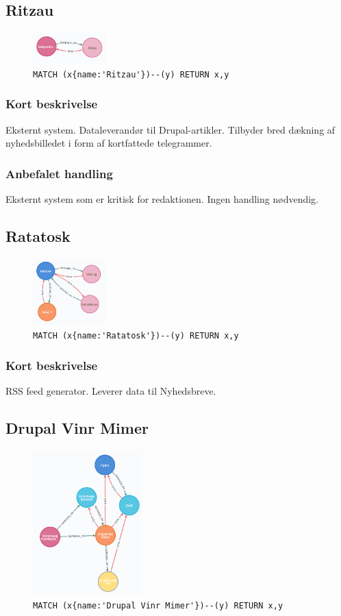 \documentclass{article}
\begin{document}
\subsection{Ritzau}
\begin{figure}[H]
\includegraphics[width=80pt]{Ritzau.PNG}
\cprotect\caption{\verb|MATCH (x{name:'Ritzau'})--(y) RETURN x,y|}
\end{figure}
\subsubsection*{Kort beskrivelse}
Eksternt system. Dataleverandør til Drupal-artikler.
Tilbyder bred dækning af nyhedsbilledet i form af kortfattede telegrammer.
\subsubsection*{Anbefalet handling}
Eksternt system som er kritisk for redaktionen. Ingen handling nødvendig.



\subsection{Ratatosk}
\begin{figure}[H]
\includegraphics[width=80pt]{Ratatosk.PNG}
\cprotect\caption{\verb|MATCH (x{name:'Ratatosk'})--(y) RETURN x,y|}
\end{figure}
\subsubsection*{Kort beskrivelse}
RSS feed generator. Leverer data til Nyhedsbreve.


\subsection{Drupal Vinr Mimer}
\begin{figure}[H]
\includegraphics[width=120pt]{DrupalVinrMimer.PNG}
\cprotect\caption{\verb|MATCH (x{name:'Drupal Vinr Mimer'})--(y) RETURN x,y|}
\end{figure}
\end{document}

